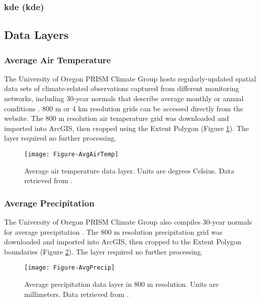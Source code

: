 \subsubsection{\acrlong{kde} (\acrshort{kde})}\label{ssn:kde}

\subsection{Data Layers}

\subsubsection{Average Air Temperature}

The University of Oregon PRISM Climate Group hosts regularly-updated spatial data sets of climate-related observations captured from different monitoring networks, including 30-year normals that describe average monthly or annual conditions \citep{daly_physiographically_2008, prism_prism_2021}. 800 m or 4 km resolution grids can be accessed directly from the website. The 800 m resolution air temperature grid was downloaded and imported into ArcGIS, then cropped using the Extent Polygon (Figure \ref{fig:feat_airtemp}). The layer required no further processing.

\begin{figure}[!htp]
\centering
\texttt{[image: Figure-AvgAirTemp]}
\caption[Average air temperature data layer]{Average air temperature data layer. Units are degrees Celsius. Data retrieved from \protect\citep{prism_prism_2021}.}
\label{fig:feat_airtemp}
\end{figure}

\subsubsection{Average Precipitation}

The University of Oregon PRISM Climate Group also compiles 30-year normals for average precipitation \citep{daly_physiographically_2008, prism_prism_2021}. The 800 m resolution precipitation grid was downloaded and imported into ArcGIS, then cropped to the Extent Polygon boundaries (Figure \ref{fig:feat_precip}). The layer required no further processing.

\begin{figure}[!htp]
\centering
\texttt{[image: Figure-AvgPrecip]}
\caption[Average precipitation data layer]{Average precipitation data layer in 800 m resolution. Units are millimeters. Data retrieved from \protect\citep{prism_prism_2021}.}
\label{fig:feat_precip}
\end{figure}

